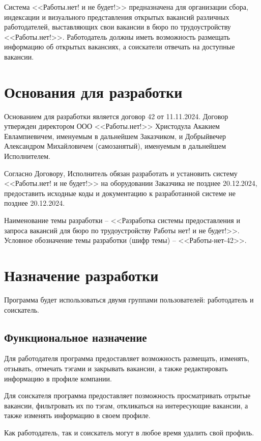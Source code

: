 \documentclass[a4page]{article}
\begin{document}
Система <<Работы.нет! и не будет!>> предназначена для организации сбора, индексации и визуального представления открытых вакансий различных работодателей, выставляющих свои вакансии в бюро по трудоустройству <<Работы.нет!>>. Работодатель должны иметь возможность размещать информацию об открытых вакансиях, а соискатели отвечать на доступные вакансии.

\section{Основания для разработки}

Основанием для разработки является договор 42 от 11.11.2024. Договор утвержден директором ООО <<Работы.нет!>> Христодула Акакием Евлампиевичем, именуемым в дальнейшем Заказчиком, и Добрыйвечер Александром Михайловичем (самозанятый), именуемым в дальнейшем Исполнителем.

Согласно Договору, Исполнитель обязан разработать и установить систему <<Работы.нет! и не будет!>> на оборудовании Заказчика не позднее 20.12.2024, предоставить исходные коды и документацию к разработанной системе не позднее 20.12.2024.

Наименование темы разработки – <<Разработка системы предоставления и запроса вакансий для бюро по трудоустройству Работы нет! и не будет!>>.
Условное обозначение темы разработки (шифр темы) – <<Работы-нет-42>>.

\section{Назначение разработки}

Программа будет использоваться двумя группами пользователей: работодатель и соискатель.

\subsection{Функциональное назначение}

Для работодателя программа предоставляет возможность размещать, изменять, отзывать, отмечать тэгами и закрывать вакансии, а также редактировать информацию в профиле компании.

Для соискателя программа предоставляет позможность просматривать отрытые вакансии, фильтровать их по тэгам, откликаться на интересующие вакансии, а также изменять информацию в своем профиле.

Как работодатель, так и соискатель могут в любое время удалить свой профиль.
\end{document}

